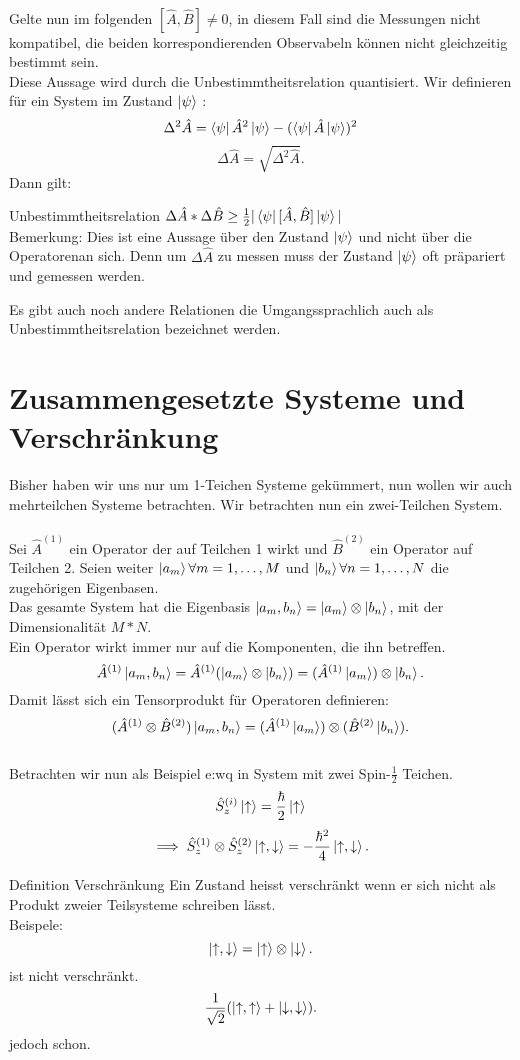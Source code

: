 \documentclass{report}
\begin{document}
\\
Gelte nun im folgenden $[\hat{A}, \hat{B}] \neq 0$, in diesem Fall sind die Messungen nicht kompatibel, die beiden korrespondierenden Observabeln können nicht gleichzeitig bestimmt sein.\\
Diese Aussage wird durch die Unbestimmtheitsrelation quantisiert. Wir definieren für ein System im Zustand $\ket{\psi} $ : \[
	\Delta^2 \hat{A} = \bra{\psi} \hat{A}^2 \ket{\psi} - (\bra{\psi} \hat{A} \ket{\psi})^2     
\] \[
\Delta \hat{A} = \sqrt{\Delta^2 \hat{A}} 
.\]  Dann gilt:
\begin{redbox}{Unbestimmtheitsrelation}
	$\Delta \hat{A} * \Delta \hat{B} \ge \frac{1}{2} | \bra{\psi} [\hat{A}, \hat{B}] \ket{\psi}| $ \\
	Bemerkung: Dies ist eine Aussage über den Zustand $\ket{\psi} $ und nicht über die Operatorenan sich. Denn um $\Delta \hat{A}$ zu messen muss der Zustand $\ket{\psi} $ oft präpariert und gemessen werden.
\end{redbox}
Es gibt auch noch andere Relationen die Umgangssprachlich auch als Unbestimmtheitsrelation bezeichnet werden.
\section{Zusammengesetzte Systeme und Verschränkung}
Bisher haben wir uns nur um 1-Teichen Systeme gekümmert, nun wollen wir auch mehrteilchen Systeme betrachten. Wir betrachten nun ein zwei-Teilchen System.\\
\\
Sei $\hat{A}^{(1)}$ ein Operator der auf Teilchen 1 wirkt und $\hat{B}^{(2)}$ ein Operator auf Teilchen 2. Seien weiter $\ket{a_m} \forall m = 1, \ldots, M$ und $\ket{b_n} \forall n = 1, \ldots, N$ die zugehörigen Eigenbasen. \\
Das gesamte System hat die Eigenbasis $\ket{a_m, b_n} = \ket{a_m} \otimes \ket{b_n}$, mit der Dimensionalität $M * N$.\\
Ein Operator wirkt immer nur auf die Komponenten, die ihn betreffen. \[
	\hat{A}^{(1)} \ket{a_m, b_n} = \hat{A}^{(1)} (\ket{a_m} \otimes \ket{b_n}) = (\hat{A}^{(1)} \ket{a_m} ) \otimes \ket{b_n}
.\] Damit lässt sich ein Tensorprodukt für Operatoren definieren: \[
(\hat{A}^{(1)} \otimes \hat{B}^{(2)}) \ket{a_m, b_n} = (\hat{A}^{(1)} \ket{a_m} ) \otimes (\hat{B}^{(2)} \ket{b_n} ) 
.\] \\
Betrachten wir nun als Beispiel e:wq
in System mit zwei Spin-$\frac{1}{2}$ Teichen. \\ \[
	\hat{S}_z^{(i)} \ket{\uparrow} = \frac{\hbar}{2} \ket{\uparrow}  
\] \[
\implies \hat{S}_z^{(1)} \otimes \hat{S}_z^{(2)} \ket{\uparrow, \downarrow} = - \frac{\hbar^2}{4} \ket{\uparrow, \downarrow} 		
.\] 
\begin{greenbox}{Definition Verschränkung}
	Ein Zustand heisst verschränkt wenn er sich nicht als Produkt zweier Teilsysteme schreiben lässt. \\
	Beispele: \[
	\ket{\uparrow, \downarrow} = \ket{\uparrow} \otimes \ket{\downarrow} 
	.\] ist nicht verschränkt. \[
	\frac{1}{\sqrt{2} } (\ket{\uparrow, \uparrow} + \ket{\downarrow, \downarrow} )
	.\] jedoch schon.
\end{greenbox}
\end{document}
